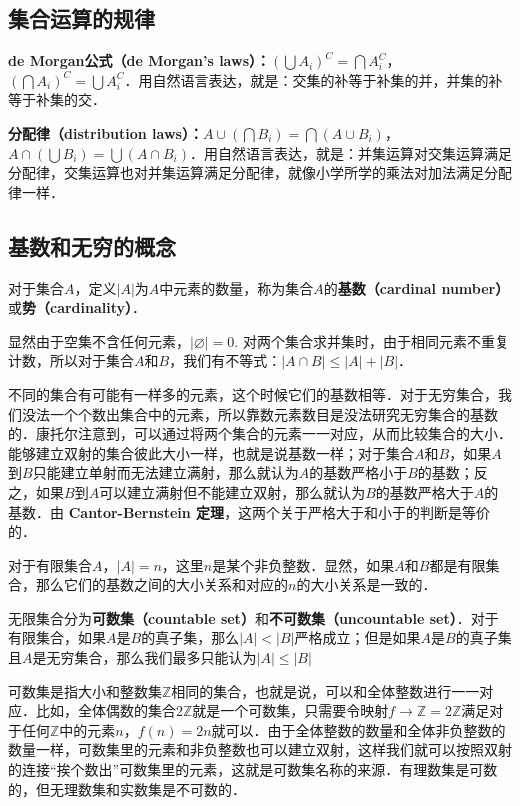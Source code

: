 \subsection{集合运算的规律}

\textbf{de Morgan公式（de Morgan's laws）：}$(\bigcup A_i)^C=\bigcap A_i^C$，$(\bigcap A_i)^C=\bigcup A_i^C$．用自然语言表达，就是：交集的补等于补集的并，并集的补等于补集的交．

\textbf{分配律（distribution laws）：}$A\cup(\bigcap B_i)=\bigcap (A\cup B_i)$，$A\cap(\bigcup B_i)=\bigcup (A\cap B_i)$．用自然语言表达，就是：并集运算对交集运算满足分配律，交集运算也对并集运算满足分配律，就像小学所学的乘法对加法满足分配律一样．

\subsection{基数和无穷的概念}

对于集合$A$，定义$|A|$为$A$中元素的数量，称为集合$A$的\textbf{基数（cardinal number）}或\textbf{势（cardinality）}．

显然由于空集不含任何元素，$|\varnothing|=0$. 对两个集合求并集时，由于相同元素不重复计数，所以对于集合$A$和$B$，我们有不等式：$|A\cap B|\le|A|+|B|$．

不同的集合有可能有一样多的元素，这个时候它们的基数相等．对于无穷集合，我们没法一个个数出集合中的元素，所以靠数元素数目是没法研究无穷集合的基数的．康托尔注意到，可以通过将两个集合的元素一一对应，从而比较集合的大小．能够建立双射的集合彼此大小一样，也就是说基数一样；对于集合$A$和$B$，如果$A$到$B$只能建立单射而无法建立满射，那么就认为$A$的基数严格小于$B$的基数；反之，如果$B$到$A$可以建立满射但不能建立双射，那么就认为$B$的基数严格大于$A$的基数．由 \textbf{Cantor-Bernstein 定理}，这两个关于严格大于和小于的判断是等价的．

对于有限集合$A$，$|A|=n$，这里$n$是某个非负整数．显然，如果$A$和$B$都是有限集合，那么它们的基数之间的大小关系和对应的$n$的大小关系是一致的．

无限集合分为\textbf{可数集（countable set）}和\textbf{不可数集（uncountable set）}．对于有限集合，如果$A$是$B$的真子集，那么$|A|<|B|$严格成立；但是如果$A$是$B$的真子集且$A$是无穷集合，那么我们最多只能认为$|A|\le|B|$

可数集是指大小和整数集$\mathbb{Z}$相同的集合，也就是说，可以和全体整数进行一一对应．比如，全体偶数的集合$2\mathbb{Z}$就是一个可数集，只需要令映射$f\rightarrow \mathbb{Z}=2\mathbb{Z}$满足对于任何$\mathbb{Z}$中的元素$n$，$f(n)=2n$就可以．由于全体整数的数量和全体非负整数的数量一样，可数集里的元素和非负整数也可以建立双射，这样我们就可以按照双射的连接“挨个数出”可数集里的元素，这就是可数集名称的来源．有理数集是可数的，但无理数集和实数集是不可数的．

